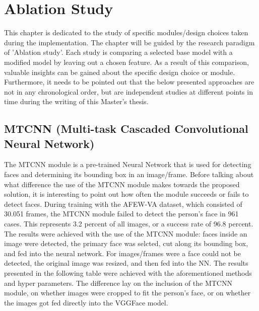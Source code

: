 \section{Ablation Study}
This chapter is dedicated to the study of specific modules/design choices taken during the implementation. The chapter will be guided by the research paradigm of 'Ablation study'. Each study is comparing a selected base model with a modified model by leaving out a chosen feature. As a result of this comparison, valuable insights can be gained about the specific design choice or module. Furthermore, it needs to be pointed out that the below presented approaches are not in any chronological order, but are independent studies at different points in time during the writing of this Master's thesis.

\subsection{MTCNN (Multi-task Cascaded Convolutional Neural Network)}
The MTCNN module is a pre-trained Neural Network that is used for detecting faces and determining its bounding box in an image/frame. Before talking about what difference the use of the MTCNN module makes towards the proposed solution, it is interesting to point out how often the module succeeds or fails to detect faces.
\newline\newline
During training with the AFEW-VA dataset, which consisted of 30.051 frames, the MTCNN module failed to detect the person's face in 961 cases. This represents 3.2 percent of all images, or a success rate of 96.8 percent.
\newline\newline
The results were achieved with the use of the MTCNN module: faces inside an image were detected, the primary face was selcted, cut along its bounding box, and fed into the neural network. For images/frames were a face could not be detected, the original image was resized, and then fed into the NN.
\newline\newline
The results presented in the following table were achieved with the aforementioned methods and hyper parameters. The difference lay on the inclusion of the MTCNN module, on whether images were cropped to fit the person's face, or on whether the images got fed directly into the VGGFace model.

